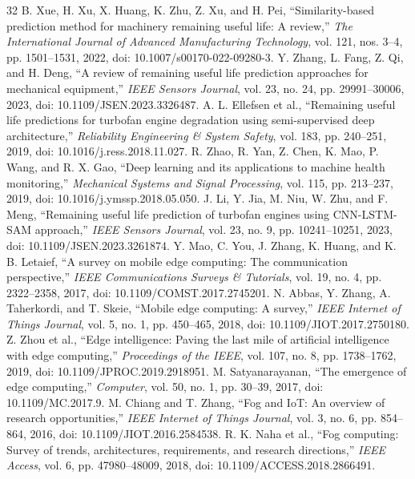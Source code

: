 ﻿\documentclass[conference]{IEEEtran}
\begin{document}
\begin{thebibliography}{32}
 B. Xue, H. Xu, X. Huang, K. Zhu, Z. Xu, and H. Pei, ``Similarity-based prediction method for machinery remaining useful life: A review,'' \emph{The International Journal of Advanced Manufacturing Technology}, vol. 121, nos. 3--4, pp. 1501--1531, 2022, doi: 10.1007/s00170-022-09280-3.
 Y. Zhang, L. Fang, Z. Qi, and H. Deng, ``A review of remaining useful life prediction approaches for mechanical equipment,'' \emph{IEEE Sensors Journal}, vol. 23, no. 24, pp. 29991--30006, 2023, doi: 10.1109/JSEN.2023.3326487.
 A. L. Ellefsen et al., ``Remaining useful life predictions for turbofan engine degradation using semi-supervised deep architecture,'' \emph{Reliability Engineering \& System Safety}, vol. 183, pp. 240--251, 2019, doi: 10.1016/j.ress.2018.11.027.
 R. Zhao, R. Yan, Z. Chen, K. Mao, P. Wang, and R. X. Gao, ``Deep learning and its applications to machine health monitoring,'' \emph{Mechanical Systems and Signal Processing}, vol. 115, pp. 213--237, 2019, doi: 10.1016/j.ymssp.2018.05.050.
 J. Li, Y. Jia, M. Niu, W. Zhu, and F. Meng, ``Remaining useful life prediction of turbofan engines using CNN-LSTM-SAM approach,'' \emph{IEEE Sensors Journal}, vol. 23, no. 9, pp. 10241--10251, 2023, doi: 10.1109/JSEN.2023.3261874.
 Y. Mao, C. You, J. Zhang, K. Huang, and K. B. Letaief, ``A survey on mobile edge computing: The communication perspective,'' \emph{IEEE Communications Surveys \& Tutorials}, vol. 19, no. 4, pp. 2322--2358, 2017, doi: 10.1109/COMST.2017.2745201.
 N. Abbas, Y. Zhang, A. Taherkordi, and T. Skeie, ``Mobile edge computing: A survey,'' \emph{IEEE Internet of Things Journal}, vol. 5, no. 1, pp. 450--465, 2018, doi: 10.1109/JIOT.2017.2750180.
 Z. Zhou et al., ``Edge intelligence: Paving the last mile of artificial intelligence with edge computing,'' \emph{Proceedings of the IEEE}, vol. 107, no. 8, pp. 1738--1762, 2019, doi: 10.1109/JPROC.2019.2918951.
 M. Satyanarayanan, ``The emergence of edge computing,'' \emph{Computer}, vol. 50, no. 1, pp. 30--39, 2017, doi: 10.1109/MC.2017.9.
 M. Chiang and T. Zhang, ``Fog and IoT: An overview of research opportunities,'' \emph{IEEE Internet of Things Journal}, vol. 3, no. 6, pp. 854--864, 2016, doi: 10.1109/JIOT.2016.2584538.
 R. K. Naha et al., ``Fog computing: Survey of trends, architectures, requirements, and research directions,'' \emph{IEEE Access}, vol. 6, pp. 47980--48009, 2018, doi: 10.1109/ACCESS.2018.2866491.
\end{thebibliography}
\end{document}

